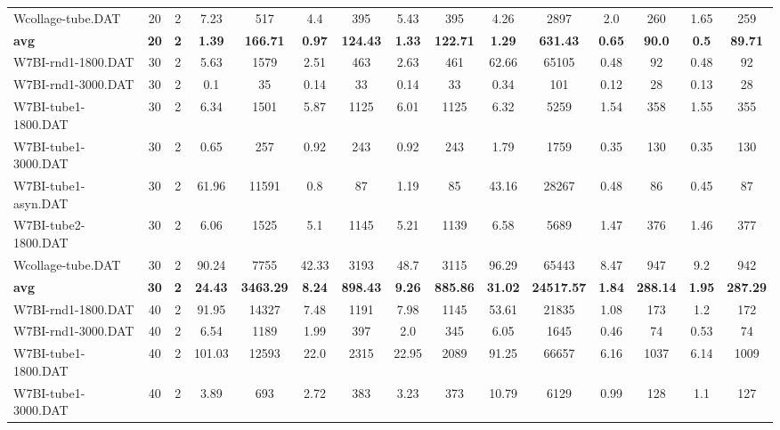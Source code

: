\begin{table}[!ht]
{\begin{tabular}{lcccccccccccccc}
Wcollage-tube.DAT & 20 & 2 & 7.23 & 517 & 4.4 & 395 & 5.43 & 395 & 4.26 & 2897 & 2.0 & 260 &  \textcolor{blue2}{1.65} & 259 \\
\cline{1-15} \textbf{avg} & \textbf{20} & \textbf{2} & \textbf{1.39} & \textbf{166.71} & \textbf{0.97} & \textbf{124.43} & \textbf{1.33} & \textbf{122.71} & \textbf{1.29} & \textbf{631.43} & \textbf{0.65} & \textbf{90.0} & \textbf{0.5} & \textbf{89.71} \\ \cline{1-15}
W7BI-rnd1-1800.DAT & 30 & 2 & 5.63 & 1579 & 2.51 & 463 & 2.63 & 461 & 62.66 & 65105 &  \textcolor{blue2}{0.48} & 92 &  \textcolor{blue2}{0.48} & 92 \\
W7BI-rnd1-3000.DAT & 30 & 2 &  \textcolor{blue2}{0.1} & 35 & 0.14 & 33 & 0.14 & 33 & 0.34 & 101 & 0.12 & 28 & 0.13 & 28 \\
W7BI-tube1-1800.DAT & 30 & 2 & 6.34 & 1501 & 5.87 & 1125 & 6.01 & 1125 & 6.32 & 5259 &  \textcolor{blue2}{1.54} & 358 & 1.55 & 355 \\
W7BI-tube1-3000.DAT & 30 & 2 & 0.65 & 257 & 0.92 & 243 & 0.92 & 243 & 1.79 & 1759 &  \textcolor{blue2}{0.35} & 130 &  \textcolor{blue2}{0.35} & 130 \\
W7BI-tube1-asyn.DAT & 30 & 2 & 61.96 & 11591 & 0.8 & 87 & 1.19 & 85 & 43.16 & 28267 & 0.48 & 86 &  \textcolor{blue2}{0.45} & 87 \\
W7BI-tube2-1800.DAT & 30 & 2 & 6.06 & 1525 & 5.1 & 1145 & 5.21 & 1139 & 6.58 & 5689 & 1.47 & 376 &  \textcolor{blue2}{1.46} & 377 \\
Wcollage-tube.DAT & 30 & 2 & 90.24 & 7755 & 42.33 & 3193 & 48.7 & 3115 & 96.29 & 65443 &  \textcolor{blue2}{8.47} & 947 & 9.2 & 942 \\
\cline{1-15} \textbf{avg} & \textbf{30} & \textbf{2} & \textbf{24.43} & \textbf{3463.29} & \textbf{8.24} & \textbf{898.43} & \textbf{9.26} & \textbf{885.86} & \textbf{31.02} & \textbf{24517.57} & \textbf{1.84} & \textbf{288.14} & \textbf{1.95} & \textbf{287.29} \\ \cline{1-15}
W7BI-rnd1-1800.DAT & 40 & 2 & 91.95 & 14327 & 7.48 & 1191 & 7.98 & 1145 & 53.61 & 21835 &  \textcolor{blue2}{1.08} & 173 & 1.2 & 172 \\
W7BI-rnd1-3000.DAT & 40 & 2 & 6.54 & 1189 & 1.99 & 397 & 2.0 & 345 & 6.05 & 1645 &  \textcolor{blue2}{0.46} & 74 & 0.53 & 74 \\
W7BI-tube1-1800.DAT & 40 & 2 & 101.03 & 12593 & 22.0 & 2315 & 22.95 & 2089 & 91.25 & 66657 & 6.16 & 1037 &  \textcolor{blue2}{6.14} & 1009 \\
W7BI-tube1-3000.DAT & 40 & 2 & 3.89 & 693 & 2.72 & 383 & 3.23 & 373 & 10.79 & 6129 &  \textcolor{blue2}{0.99} & 128 & 1.1 & 127 \\

\end{tabular}}
\end{table}
